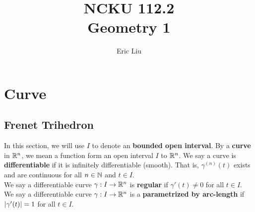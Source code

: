 \documentclass{report}
\title{\Huge{NCKU 112.2}\\
Geometry 1}
\author{\huge{Eric Liu}}
\date{}
\begin{document}
\maketitle
\newpage%
\tableofcontents
\pagebreak
\chapter{Curve}
\section{Frenet Trihedron}
\begin{mdframed}
In this section, we will use $I$ to denote an \textbf{bounded open interval}. By a \textbf{curve} in $\mathbb{R}^n$, we mean a function form an open interval $I$ to $\mathbb{R}^n$.  We say a curve is \textbf{differentiable} if it is infinitely differentiable (smooth). That is, $\gamma ^{(n)}(t)$ exists and are continuous for all $n\in\mathbb{N}$ and $t \in I$.\\

We say a differentiable curve $\gamma  :I\rightarrow \mathbb{R}^n$ is \textbf{regular} if $\gamma '(t)\neq 0$ for all $t  \in I$. We say a differentiable curve $\gamma :I\rightarrow \mathbb{R}^n$ is a \textbf{parametrized by arc-length} if $\left|\gamma '(t)\right|=1$ for all $t \in I$. 
\end{mdframed}
\end{document}
